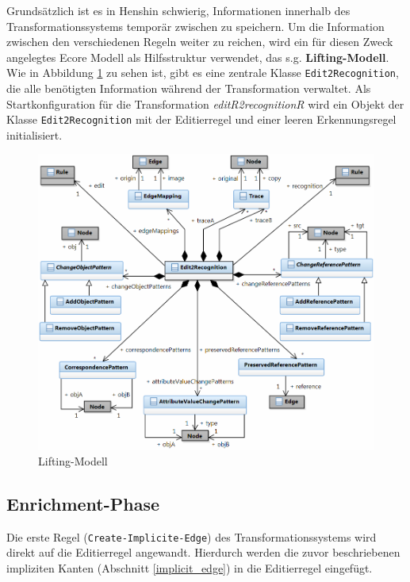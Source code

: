 Grundsätzlich ist es in Henshin schwierig, Informationen innerhalb des Transformationssystems
temporär zwischen zu speichern. Um die Information zwischen den verschiedenen Regeln weiter zu
reichen, wird ein für diesen Zweck angelegtes Ecore Modell als Hilfsstruktur verwendet, das s.g.
\textbf{Lifting-Modell}. Wie in Abbildung \ref{fig:lifting_model} zu sehen ist, gibt es eine
zentrale Klasse \texttt{Edit2Recognition}, die alle benötigten Information während der
Transformation verwaltet. Als Startkonfiguration für die Transformation \textit{editR2recognitionR}
wird ein Objekt der Klasse \texttt{Edit2Recognition} mit der Editierregel und einer leeren
Erkennungsregel initialisiert.

\begin{figure}[h!]
  \centering
  \includegraphics[width=1.0\textwidth]{images/lifting_model.png}
  \caption{Lifting-Modell}
  \label{fig:lifting_model}
\end{figure}

\subsection{Enrichment-Phase}

Die erste Regel (\texttt{Create-Implicite-Edge}) des Transformationssystems wird direkt auf die
Editierregel angewandt. Hierdurch werden die zuvor beschriebenen impliziten Kanten (Abschnitt
\ref{implicit_edge}) in die Editierregel eingefügt.

